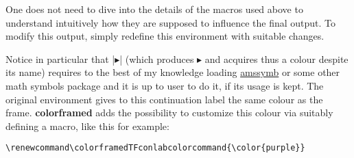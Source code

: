 \documentclass[a4paper,dvipdfmx,11pt,english]{article}
\def\colorframedTFconlabcolorcommand{\color{purple}}
\def\ctanpackage#1{\href{https://ctan.org/pkg/#1}{#1}}
\newcommand\colorframed{%
        \texorpdfstring{{\color{joli}\bfseries colorframed}}{colorframed}\xspace}
\begin{document}
\begin{snugshade*}
\leavevmode\color{OliveGreen}
  One does not need to dive into the details of the macros
  used above to understand intuitively how they are supposed
  to influence the final output.  To modify this output,
  simply redefine this environment with suitable changes.

  Notice in particular that |$\blacktriangleright$|
  (which produces $\blacktriangleright$ and acquires thus a colour
  despite its name) requires to
  the best of my knowledge loading \ctanpackage{amssymb} or
  some other math symbols package and it is up to user to do it, if
  its usage is kept.
%
  The original environment gives to this continuation label the
  same colour as the frame.  \colorframed adds the
  possibility to customize this colour via suitably defining a
  macro, like this for example:%
\begin{verbatim}
\renewcommand\colorframedTFconlabcolorcommand{\color{purple}}
\end{verbatim}
\end{snugshade*}
\end{document}
